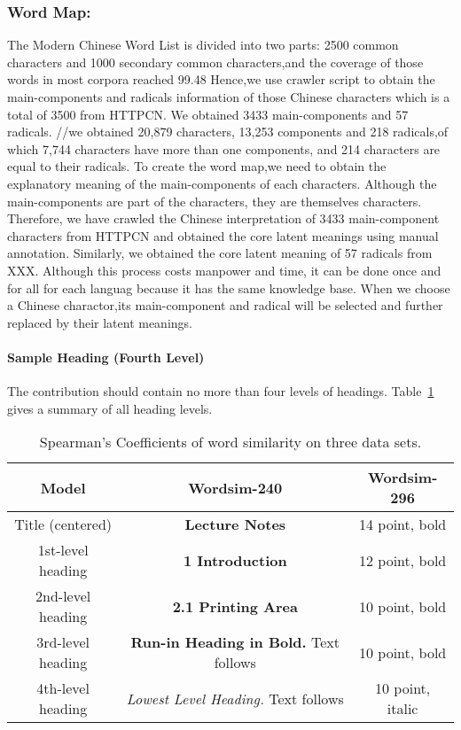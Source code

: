 \documentclass[runningheads]{llncs}
\begin{document}
\subsubsection{Word Map:}
The Modern Chinese Word List is divided into two parts: 2500 common characters and 1000 secondary common characters,and the coverage of those words in most corpora reached 99.48%
Hence,we use crawler script to obtain the main-components and radicals information of those Chinese characters which is a total of 3500 from HTTPCN. We obtained 3433 main-components and 57 radicals.
//we obtained 20,879 characters, 13,253 components and 218 radicals,of which 7,744 characters have more than one components, and 214 characters are equal to their radicals.
To create the word map,we need to obtain the explanatory meaning of the main-components of each characters.
Although the main-components are part of the characters, they are themselves characters.
Therefore, we have crawled the Chinese interpretation of 3433 main-component characters from HTTPCN and obtained the core latent meanings using manual annotation.
Similarly, we obtained the core latent meaning of 57 radicals from XXX.
Although this process costs manpower and time, it can be done once and for all for each languag because it has the same knowledge base.
When we choose a Chinese charactor,its main-component and radical will be selected and further replaced by their latent meanings.

\paragraph{Sample Heading (Fourth Level)}
The contribution should contain no more than four levels of
headings. Table~\ref{tab1} gives a summary of all heading levels.

\begin{table}[!htbp]
\caption{Spearman’s Coefficients of word similarity on three data sets.}\label{tab1}
\begin{tabular}{ccc}
\toprule
 \textbf{Model} &  \textbf{Wordsim-240} &\textbf{Wordsim-296}  \\
\hline
Title (centered) &  {\Large\bfseries Lecture Notes} & 14 point, bold\\
1st-level heading &  {\large\bfseries 1 Introduction} & 12 point, bold\\
2nd-level heading & {\bfseries 2.1 Printing Area} & 10 point, bold\\
3rd-level heading & {\bfseries Run-in Heading in Bold.} Text follows & 10 point, bold\\
4th-level heading & {\itshape Lowest Level Heading.} Text follows & 10 point, italic\\
\bottomrule %
\end{tabular}
\end{table}
\end{document}
